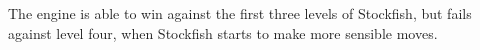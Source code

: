 The engine is able to win against the first three levels of Stockfish, but fails against level four, when Stockfish starts to make more sensible moves.











